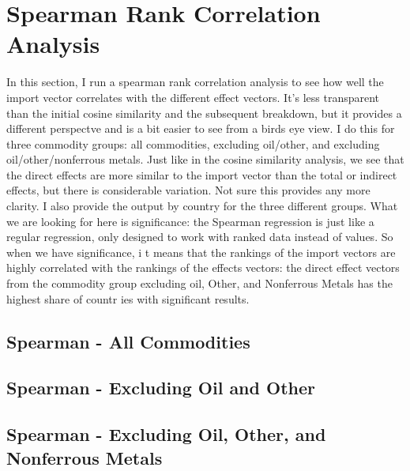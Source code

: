\documentclass{article}
\begin{document}
\section{Spearman Rank Correlation Analysis}
In this section, I run a spearman rank correlation analysis to see how well the import vector correlates with the different effect vectors. It's less transparent than the initial cosine similarity and the subsequent 
breakdown, but it provides a different perspectve and is a bit easier to see from a birds eye view. I do this for three commodity groups: all commodities, excluding oil/other, and excluding oil/other/nonferrous metals. Just like in 
the cosine similarity analysis, we see that the direct effects are more similar to the import vector than the total or indirect effects, but there is considerable variation. Not sure this provides any more clarity. I also provide the 
output by country for the three different groups. What we are looking for here is significance: the Spearman regression is just like a regular regression, only designed to work with ranked data instead of values. So when we have significance, i
t means that the rankings of the import vectors are highly correlated with the rankings of the effects vectors: the direct effect vectors from the commodity group excluding oil, Other, and Nonferrous Metals has the highest share of countr
ies with significant results. 


\subsection{Spearman - All Commodities}


\subsection{Spearman - Excluding Oil and Other}


\subsection{Spearman - Excluding Oil, Other, and Nonferrous Metals}

\end{document}
